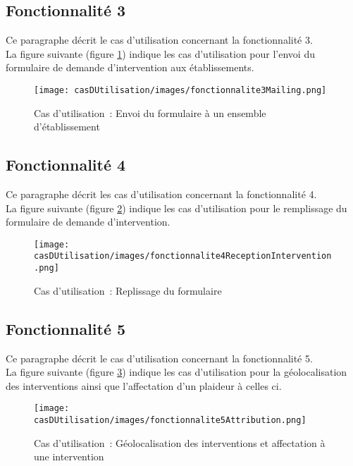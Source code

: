\subsection{Fonctionnalité 3}
Ce paragraphe décrit le cas d'utilisation concernant la fonctionnalité 3. \\

La figure suivante (figure \ref{diagrammeCasUtilisation3}) indique les cas d'utilisation pour l'envoi du formulaire de demande d'intervention aux établissements.
\begin{figure}[H]
	\centering
	\texttt{[image: casDUtilisation/images/fonctionnalite3Mailing.png]}
	\caption{Cas d'utilisation~: Envoi du formulaire à un ensemble d'établissement}
	\label{diagrammeCasUtilisation3}
\end{figure}

\subsection{Fonctionnalité 4}
Ce paragraphe décrit les cas d'utilisation concernant la fonctionnalité 4. \\

La figure suivante (figure \ref{diagrammeCasUtilisation4}) indique les cas d'utilisation pour le remplissage du formulaire de demande d'intervention.
\begin{figure}[H]
	\centering
	\texttt{[image: casDUtilisation/images/fonctionnalite4ReceptionIntervention.png]}
	\caption{Cas d'utilisation~: Replissage du formulaire}
	\label{diagrammeCasUtilisation4}
\end{figure}

\subsection{Fonctionnalité 5}
Ce paragraphe décrit le cas d'utilisation concernant la fonctionnalité 5. \\

La figure suivante (figure \ref{diagrammeCasUtilisation5}) indique les cas d'utilisation pour la géolocalisation des interventions ainsi que l'affectation d'un plaideur à celles ci. \\
\begin{figure}[H]
	\centering
	\texttt{[image: casDUtilisation/images/fonctionnalite5Attribution.png]}
	\caption{Cas d'utilisation~: Géolocalisation des interventions et affectation à une intervention}
	\label{diagrammeCasUtilisation5}
\end{figure}

